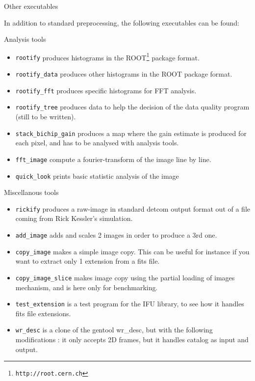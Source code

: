 \begin{subsection}{Other executables}

In addition to standard preprocessing, the following executables can
be found:

\begin{subsubsection}{Analysis tools}

\begin{itemize}
\item {\tt rootify} produces histograms in the ROOT\footnote{\tt http://root.cern.ch} package format.
\item {\tt rootify\_data} produces other histograms in the ROOT package
format.
\item {\tt rootify\_fft} produces specific histograms for FFT analysis.
\item {\tt rootify\_tree} produces data to help the decision of the
data quality program (still to be written).
\item {\tt stack\_bichip\_gain} produces a map where the gain estimate
is produced for each pixel, and has to be analysed with analysis tools.
\item {\tt fft\_image} compute a fourier-transform of the image line by
line.
\item {\tt quick\_look} prints basic statistic analysis of the image
\end{itemize}
\end{subsubsection}

\begin{subsubsection}{Miscellanous tools}

\begin{itemize}
\item {\tt rickify} produces a raw-image in standard detcom output
format out of a file coming from Rick Kessler's simulation.
\item {\tt add\_image} adds and scales 2 images in order to produce a
3rd one.
\item {\tt copy\_image} makes a simple image copy. This can be useful
for instance if you want to extract only 1 extension from a fits file.
\item {\tt copy\_image\_slice} makes image copy using the partial
loading of images mechanism, and is here only for benchmarking.
\item {\tt test\_extension} is a test program for the IFU library, to
see
how it handles fits file extensions.
\item {\tt wr\_desc} is a clone of the gentool wr\_desc, but with the
following modifications : it only accepts 2D frames, but it handles
catalog as input and output.
\end{itemize}


\end{subsubsection}
\end{subsection}
